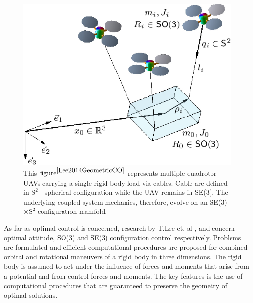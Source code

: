 \begin{figure}[H]
	\includegraphics[width=\columnwidth]{figure/payload_carrying.png}	
	\centering
	\caption{This $\text{figure}^{\cite{Lee2014GeometricCO}}$ represents multiple quadrotor UAVs carrying a single rigid-body load via cables. Cable are defined in $\text{S}^2$ - spherical configuration while the UAV remains in SE(3). The underlying coupled system mechanics, therefore, evolve on an SE(3)$\times\text{S}^2$ configuration manifold. }
	\label{fig:load_carrying}
\end{figure}

As far as optimal control is concerned, research by T.Lee et. al \cite{optimal-attitude-control}, \cite{optimal-attitude-so3} and \cite{optimal-attitude-se3} concern optimal attitude, SO(3) and SE(3) configuration control respectively. Problems are formulated and efficient computational procedures are proposed for combined orbital and rotational maneuvers of a rigid body in three dimensions. The rigid body is assumed to act under the influence of forces and moments that arise from a potential and from control forces and moments. The key features is the use of computational procedures that are guaranteed to preserve the geometry of optimal solutions.